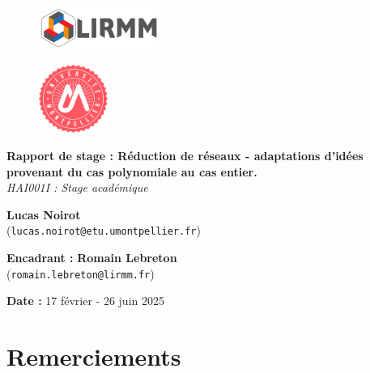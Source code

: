 \documentclass[a4paper,12pt]{report}  %
\theoremstyle{definitionstyle}
\theoremstyle{examplestyle}
\theoremstyle{remarkstyle}
\begin{document}
	
	\begin{titlepage}
		\begin{center}
			\begin{figure}[t]
				\centering
				\includegraphics[width=0.35\textwidth]{logo/logo_LIRMM.jpg} 
			\end{figure}
			\begin{figure}[t]
				\centering
				\includegraphics[width=0.2\textwidth]{logo/logo_univ_mpt.png} 
			\end{figure}
			
			\vspace{2cm}
			\Huge{\textbf{Rapport de stage : Réduction de réseaux - adaptations d'idées provenant du cas polynomiale au cas entier.}} \\
			\vspace{0.5cm}
			\large{\textit{HAI001I : Stage académique}} \\
			
			\vspace{2cm}
			
			\large{
				\textbf{Lucas Noirot} \\
				(\texttt{lucas.noirot@etu.umontpellier.fr})
			}
			
			\vspace{1.5cm}
			
			\large{
				\textbf{Encadrant :} \textbf{Romain Lebreton} \\
				(\texttt{romain.lebreton@lirmm.fr})
			}
			
			\vspace{2cm}
			
			\normalsize{
				\textbf{Date :}  17 février - 26 juin 2025
			}
		\end{center}
	\end{titlepage}
	
	\chapter*{Remerciements}
	\tableofcontents
	
\end{document}
